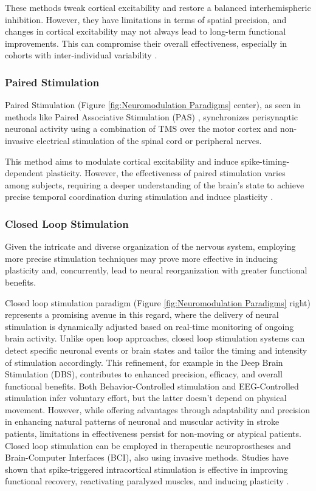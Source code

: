 These methods tweak cortical excitability and restore a balanced interhemispheric inhibition. However, they have limitations in terms of spatial precision, and changes in cortical excitability may not always lead to long-term functional improvements. This can compromise their overall effectiveness, especially in cohorts with inter-individual variability \cite{Ting2021}.

\subsubsection{Paired Stimulation} 

Paired Stimulation (Figure \ref{fig:Neuromodulation Paradigms} center), as seen in methods like Paired Associative Stimulation (PAS) \cite{Alder2019}, synchronizes perisynaptic neuronal activity using a combination of TMS over the motor cortex and non-invasive electrical stimulation of the spinal cord or peripheral nerves. 

This method aims to modulate cortical excitability and induce spike-timing-dependent plasticity. However, the effectiveness of paired stimulation varies among subjects, requiring a deeper understanding of the brain's state to achieve precise temporal coordination during stimulation and induce plasticity \cite{Ting2021}.

\subsubsection{Closed Loop Stimulation}

Given the intricate and diverse organization of the nervous system, employing more precise stimulation techniques may prove more effective in inducing plasticity and, concurrently, lead to neural reorganization with greater functional benefits.

Closed loop stimulation paradigm (Figure \ref{fig:Neuromodulation Paradigms} right) represents a promising avenue in this regard, where the delivery of neural stimulation is dynamically adjusted based on real-time monitoring of ongoing brain activity. 
Unlike open loop approaches, closed loop stimulation systems can detect specific neuronal events or brain states and tailor the timing and intensity of stimulation accordingly. This refinement, for example in the  Deep Brain Stimulation (DBS), contributes to enhanced precision, efficacy, and overall functional benefits.
Both Behavior-Controlled stimulation and EEG-Controlled stimulation infer voluntary effort, but the latter doesn’t depend on physical movement. However, while offering advantages through adaptability and precision in enhancing natural patterns of neuronal and muscular activity in stroke patients, limitations in effectiveness persist for non-moving or atypical patients.
Closed loop stimulation can be employed in therapeutic neuroprostheses and Brain-Computer Interfaces (BCI), also using invasive methods. Studies have shown that spike-triggered intracortical stimulation is effective in improving functional recovery, reactivating paralyzed muscles, and inducing plasticity \cite{Ting2021}.

